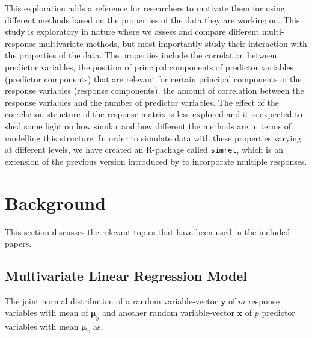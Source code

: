 \documentclass[11pt,twoside,openright,titlepage,
  headinclude,footinclude,BCOR=5mm,
  numbers=noenddot,cleardoublepage=empty,
  tablecaptionabove, dottedtoc,
  bibliography=totoc,paper=a4]{scrreprt}
\begin{document}
This exploration adds a reference for researchers to motivate them for using different methods based on the properties of the data they are working on. This study is exploratory in nature where we assess and compare different multi-response multivariate methods, but most importantly study their interaction with the properties of the data. The properties include the correlation between predictor variables, the position of principal components of predictor variables (predictor components) that are relevant for certain principal components of the response variables (response components), the amount of correlation between the response variables and the number of predictor variables. The effect of the correlation structure of the response matrix is less explored and it is expected to shed some light on how similar and how different the methods are in terms of modelling this structure. In order to simulate data with these properties varying at different levels, we have created an R-package called \texttt{simrel}, which is an extension of the previous version introduced by \citet{saebo2015simrel} to incorporate multiple responses.

\hypertarget{background}{%
\chapter{Background}\label{background}}

This section discusses the relevant topics that have been used in the included papers.

\hypertarget{multivariate-linear-regression-model}{%
\section{Multivariate Linear Regression Model}\label{multivariate-linear-regression-model}}

The joint normal distribution of a random variable-vector \(\mathbf{y}\) of \(m\) response variables with mean of \(\boldsymbol{\mu}_y\) and another random variable-vector \(\mathbf{x}\) of \(p\) predictor variables with mean \(\boldsymbol{\mu}_x\) as,
\end{document}
